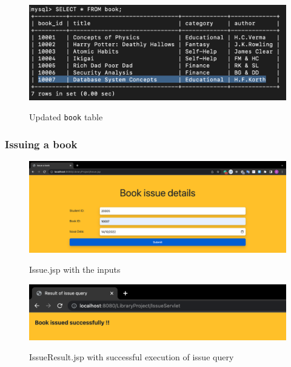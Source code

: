 \documentclass[12pt]{article}
\let\oldtexttt\texttt
\renewcommand{\texttt}[1]{
  \colorbox{bgcolor}{\oldtexttt{#1}}
  }
\begin{document}
\begin{figure}[!hbt]
    \centering
    \includegraphics[scale=0.61]{screenshots/b3_08.png}
    \label{fig:my_label1}
    \caption{Updated \oldtexttt{book} table}
\end{figure}

\newpage

\subsubsection{Issuing a book}

\begin{figure}[!hbt]
    \centering
    \includegraphics[scale=0.34]{screenshots/b3_09.png}
    \label{fig:my_label1}
    \caption{Issue.jsp with the inputs}
\end{figure}

\begin{figure}[!hbt]
    \centering
    \includegraphics[scale=0.47]{screenshots/b3_10.png}
    \label{fig:my_label1}
    \caption{IssueResult.jsp with successful execution of issue query}
\end{figure}
\end{document}
